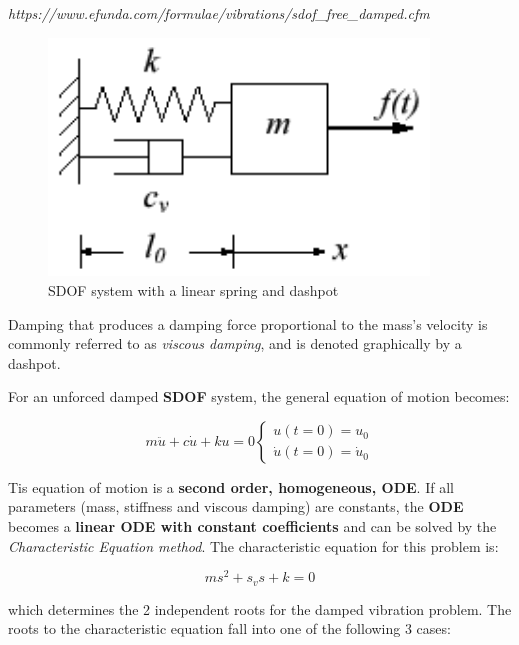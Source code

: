 \documentclass[10pt,b5paper,titlepage]{book}
\begin{document}
\textit{https://www.efunda.com/formulae/vibrations/sdof\_free\_damped.cfm}

\begin{figure}[ht]
    \centering
    \includegraphics[width=0.90\textwidth]{img/SDOF_plot.png}
    \caption{SDOF system with a linear spring and dashpot}
    \label{fig:SDOF-plot-damped-png}
\end{figure}

Damping that produces a damping force proportional to the mass's velocity is
commonly referred to as \textit{viscous damping}, and is denoted graphically
by a dashpot.

For an unforced damped \textbf{SDOF} system, the general equation of motion
becomes:

\begin{equation}
    m \ddot{u} + c \dot{u} + k u = 0
        \left\{ \begin{matrix}
                u(t=0) = u_0\\
                \dot{u}(t=0) = \dot{u}_0
          \end{matrix} \right.
\end{equation}

Tis equation of motion is a \textbf{second order, homogeneous, ODE}. If all
parameters (mass, stiffness and viscous damping) are constants, the \textbf{ODE}
becomes a \textbf{linear ODE with constant coefficients} and can be solved by
the \textit{Characteristic Equation method}. The characteristic equation for this
problem is:

\begin{equation}
    m s^2 + s_v s + k = 0
\end{equation}

which determines the 2 independent roots for the damped vibration problem.
The roots to the characteristic equation fall into one of the following
3 cases:
\end{document}
